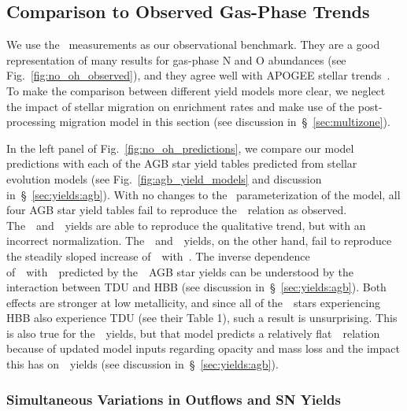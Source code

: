 \documentclass[ms.tex]{subfiles}
\begin{document}
\subsection{Comparison to Observed Gas-Phase Trends}
\label{sec:results:yields}

We use the~\citet{Dopita2016} measurements as our observational benchmark.
They are a good representation of many results for gas-phase N and O abundances
(see Fig.~\ref{fig:no_oh_observed}), and they agree well with APOGEE stellar
trends~\citep{Vincenzo2021}.
To make the comparison between different yield models more clear, we neglect
the impact of stellar migration on enrichment rates and make use of the
post-processing migration model in this section (see discussion
in~\S~\ref{sec:multizone}).
\par
In the left panel of Fig.~\ref{fig:no_oh_predictions}, we compare our model
predictions with each of the AGB star yield tables predicted from stellar
evolution models (see Fig.~\ref{fig:agb_yield_models} and discussion
in~\S~\ref{sec:yields:agb}).
With no changes to the~\citet{Johnson2021} parameterization of the model, all
four AGB star yield tables fail to reproduce the~\ohno~relation as observed.
The~\cristallo~and~\ventura~yields are able to reproduce the qualitative trend,
but with an incorrect normalization.
The~\karakasten~and~\karakas~yields, on the other hand, fail to reproduce
the steadily sloped increase of~\no~with~\oh.
The inverse dependence of~\no~with~\oh~predicted by the~\karakasten~AGB star
yields can be understood by the interaction between TDU and HBB (see discussion
in~\S~\ref{sec:yields:agb}).
Both effects are stronger at low metallicity, and since all of
the~\karakasten~stars experiencing HBB also experience TDU (see their Table 1),
such a result is unsurprising.
This is also true for the~\karakas~yields, but that model predicts a
relatively flat~\ohno~relation because of updated model inputs regarding
opacity and mass loss and the impact this has on~\Nfourteen~yields (see
discussion in~\S~\ref{sec:yields:agb}).

\subsubsection{Simultaneous Variations in Outflows and SN Yields}
\label{sec:results:yields:variations}
\end{document}
